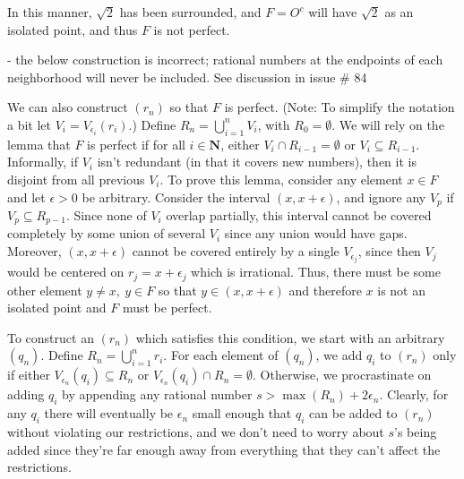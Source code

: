 \begin{solution}
{  In this manner, \(\sqrt{2}\) has been surrounded, and \(F= O^c\) will have \(\sqrt{2}\) as an isolated point, and thus \(F\) is not perfect.

  \TODO - the below construction is incorrect; rational numbers at the endpoints of each neighborhood will never be included. See discussion in issue \# 84

We can also construct \((r_n)\) so that \(F\) is perfect. (Note: To simplify the notation a bit let \(V_i = V_{\epsilon_i}(r_i)\).) Define \(R_n = \bigcup^n_{i=1} V_i\), with \(R_0 = \emptyset\). We will rely on the lemma that \(F\) is perfect if for all \(i \in \mathbf{N}\), either \(V_i \cap R_{i-1} = \emptyset\) or \(V_i \subseteq R_{i-1}\). Informally, if \(V_i\) isn't redundant (in that it covers new numbers), then it is disjoint from all previous \(V_i\). To prove this lemma, consider any element \(x \in F\) and let \(\epsilon >0\) be arbitrary. Consider the interval \((x, x + \epsilon)\), and ignore any \(V_p\) if \(V_p \subseteq R_{p-1}\). Since none of \(V_i\) overlap partially, this interval cannot be covered completely by some union of several \(V_i\) since any union would have gaps. Moreover, \((x, x + \epsilon)\) cannot be covered entirely by a single \(V_{\epsilon_j}\), since then \(V_j\) would be centered on \(r_j = x + \epsilon_j\) which is irrational. Thus, there must be some other element \(y \neq x,\ y\in F\) so that \(y \in (x, x + \epsilon)\) and therefore \(x\) is not an isolated point and \(F\) must be perfect.

To construct an \((r_n)\) which satisfies this condition, we start with an arbitrary \((q_n)\). Define \(R_n = \bigcup^n_{i=1} r_i\). For each element of \((q_n)\), we add \(q_i\) to \((r_n)\) only if either \(V_{\epsilon_n}(q_i) \subseteq R_n\) or \(V_{\epsilon_n}(q_i) \cap R_n = \emptyset\). Otherwise, we procrastinate on adding \(q_i\) by appending any rational number \(s > \max(R_n) + 2 \epsilon_n\). Clearly, for any \(q_i\) there will eventually be \(\epsilon_n\) small enough that \(q_i\) can be added to \((r_n)\) without violating our restrictions, and we don't need to worry about \(s\)'s being added since they're far enough away from everything that they can't affect the restrictions.

  }

\end{solution}
